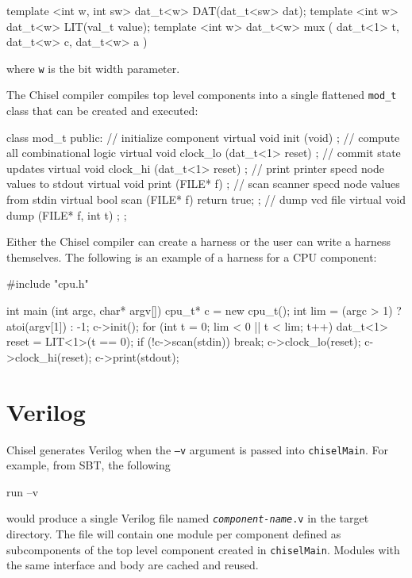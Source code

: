 \documentclass[10pt,twocolumn]{article}
\def\code#1{{\small\tt #1}}
\begin{document}
\begin{cpp}
template <int w, int sw> 
  dat_t<w> DAT(dat_t<sw> dat);
template <int w> 
  dat_t<w> LIT(val_t value);
template <int w> dat_t<w> 
  mux ( dat_t<1> t, dat_t<w> c, dat_t<w> a )
\end{cpp}

\noindent
where \code{w} is the bit width parameter.

The Chisel compiler compiles top level components into a single flattened \code{mod\_t}
class that can be created and executed:

\begin{cpp}
class mod_t {
 public:
  // initialize component
  virtual void init (void) { };
  // compute all combinational logic
  virtual void clock_lo (dat_t<1> reset) { };
  // commit state updates
  virtual void clock_hi (dat_t<1> reset) { };
  // print printer specd node values to stdout
  virtual void print (FILE* f) { };
  // scan scanner specd node values from stdin
  virtual bool scan (FILE* f) { return true; };
  // dump vcd file
  virtual void dump (FILE* f, int t) { };
};
\end{cpp}

Either the Chisel compiler can create a harness or the user can write
a harness themselves.  The following is an example of a harness for a
CPU component:

\begin{cpp}
#include "cpu.h"

int main (int argc, char* argv[]) {
  cpu_t* c = new cpu_t();
  int lim = (argc > 1) ? atoi(argv[1]) : -1;
  c->init();
  for (int t = 0; lim < 0 || t < lim; t++) {
    dat_t<1> reset = LIT<1>(t == 0);
    if (!c->scan(stdin)) break;
    c->clock_lo(reset);
    c->clock_hi(reset);
    c->print(stdout);
  }
}
\end{cpp}

\section{Verilog}

Chisel generates Verilog when the \code{--v} argument is passed into
\code{chiselMain}.  For example, from SBT, the following

\begin{scala}
run --v
\end{scala}

\noindent
would produce a single Verilog file named \code{{\it component-name}.v} in
the target directory.
The file will contain one module per component defined as subcomponents of
the top level component created in \code{chiselMain}.  Modules with
the same interface and body are cached and reused.
\end{document}
